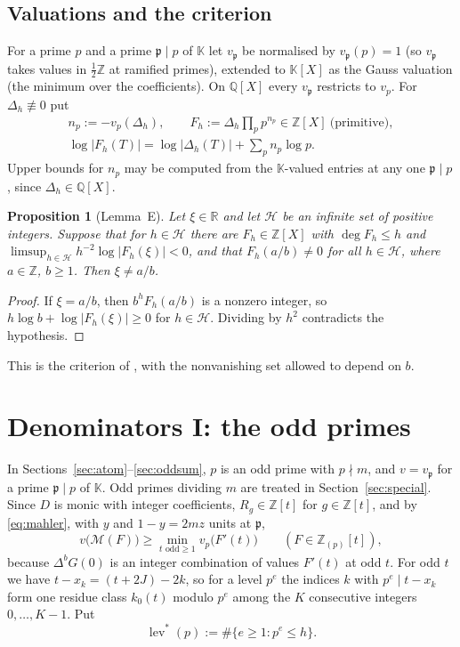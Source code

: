 \documentclass[11pt]{amsart}
\newtheorem{proposition}[theorem]{Proposition}
\theoremstyle{definition}
\theoremstyle{remark}
\numberwithin{equation}{section}
\newcommand{\ZZ}{\mathbb{Z}}
\newcommand{\QQ}{\mathbb{Q}}
\newcommand{\RR}{\mathbb{R}}
\newcommand{\KK}{\mathbb{K}}
\newcommand{\cM}{\mathcal{M}}
\newcommand{\fp}{\mathfrak{p}}
\newcommand{\lev}{\operatorname{lev}^{*}}
\begin{document}
\subsection{Valuations and the criterion}
For a prime $p$ and a prime $\fp\mid p$ of $\KK$ let $v_\fp$ be normalised by $v_\fp(p)=1$ (so $v_\fp$ takes values in
$\frac12\ZZ$ at ramified primes), extended to $\KK[X]$ as the Gauss valuation (the minimum over the coefficients). On
$\QQ[X]$ every $v_\fp$ restricts to $v_p$. For $\Delta_h\not\equiv0$ put
\begin{gather*}
  n_p:=-v_p(\Delta_h),\qquad F_h:=\Delta_h\prod_pp^{n_p}\in\ZZ[X]\ \text{(primitive)},\\
  \log|F_h(T)|=\log|\Delta_h(T)|+\sum_pn_p\log p .
\end{gather*}
Upper bounds for $n_p$ may be computed from the $\KK$-valued entries at any one $\fp\mid p$, since $\Delta_h\in\QQ[X]$.

\begin{proposition}[Lemma~E]\label{prop:criterion}
Let $\xi\in\RR$ and let $\mathcal H$ be an infinite set of positive integers. Suppose that for $h\in\mathcal H$ there are
$F_h\in\ZZ[X]$ with $\deg F_h\le h$ and $\limsup_{h\in\mathcal H}h^{-2}\log|F_h(\xi)|<0$, and that $F_h(a/b)\ne0$ for
all $h\in\mathcal H$, where $a\in\ZZ$, $b\ge1$. Then $\xi\ne a/b$.
\end{proposition}

\begin{proof}
If $\xi=a/b$, then $b^hF_h(a/b)$ is a nonzero integer, so $h\log b+\log|F_h(\xi)|\ge0$ for $h\in\mathcal H$. Dividing by
$h^2$ contradicts the hypothesis.
\end{proof}

This is the criterion of \cite[Prop.~3.1]{Chi2Paper}, with the nonvanishing set allowed to depend on $b$.

\section{Denominators I: the odd primes}\label{sec:odd}

In Sections~\ref{sec:atom}--\ref{sec:oddsum}, $p$ is an odd prime with $p\nmid m$, and $v=v_\fp$ for a prime $\fp\mid p$ of
$\KK$. Odd primes dividing $m$ are treated in Section~\ref{sec:special}. Since $D$ is monic with integer coefficients,
$R_g\in\ZZ[t]$ for $g\in\ZZ[t]$, and by \eqref{eq:mahler}, with $y$ and $1-y=2mz$ units at $\fp$,
\begin{equation}\label{eq:step3}
  v\bigl(\cM(F)\bigr)\ge\min_{t\text{ odd}\ge1}v_p\bigl(F'(t)\bigr)\qquad(F\in\ZZ_{(p)}[t]),
\end{equation}
because $\Delta^bG(0)$ is an integer combination of values $F'(t)$ at odd $t$. For odd $t$ we have
$t-x_k=(t+2J)-2k$, so for a level $p^e$ the indices $k$ with $p^e\mid t-x_k$ form one residue class $k_0(t)$ modulo
$p^e$ among the $K$ consecutive integers $0,\dots,K-1$. Put
\[
  \lev(p):=\#\{e\ge1:p^e\le h\}.
\]
\end{document}
